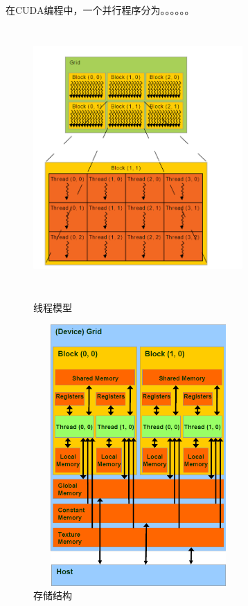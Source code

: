 \documentclass[UTF8,a4paper,11pt]{ctexart}
\begin{document}
\begin{sloppypar}
	在CUDA编程中，一个并行程序分为。。。。。。
	
	\begin{figure}[htbp]
		\centering
		\begin{minipage}[t]{0.48\textwidth}
			\centering
			\includegraphics[width=8cm,height=10cm]{./image/thread.png}
			\caption{线程模型}
			\label{fig:label}
		\end{minipage}
		\begin{minipage}[t]{0.48\textwidth}
			\centering
			\includegraphics[width=8cm,height=10cm]{./image/memory.png}
			\caption{存储结构}
			\label{fig:label}
		\end{minipage}
	\end{figure}
	

\end{sloppypar}
\end{document}
